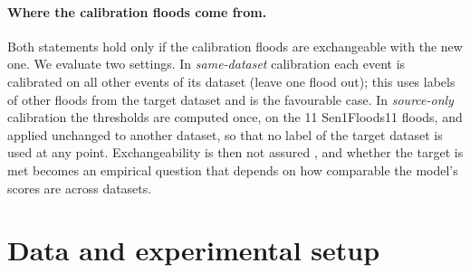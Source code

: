 \documentclass[a4paper,fleqn]{cas-sc}
\begin{document}
\paragraph{Where the calibration floods come from.} Both statements hold only if the calibration floods are exchangeable with the new one. We evaluate two settings. In \emph{same-dataset} calibration each event is calibrated on all other events of its dataset (leave one flood out); this uses labels of other floods from the target dataset and is the favourable case. In \emph{source-only} calibration the thresholds are computed once, on the 11 Sen1Floods11 floods, and applied unchanged to another dataset, so that no label of the target dataset is used at any point. Exchangeability is then not assured \citep{tibshirani2019covshift,barber2023beyond}, and whether the target is met becomes an empirical question that depends on how comparable the model's scores are across datasets.

\section{Data and experimental setup}
\label{sec:setup}
\end{document}
